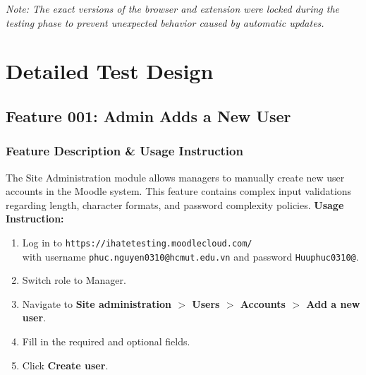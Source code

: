 \documentclass[twoside,final]{hcmut-report}
\begin{document}
\textit{Note: The exact versions of the browser and extension were locked during the testing phase to prevent unexpected behavior caused by automatic updates.}

\newpage
\section{Detailed Test Design}

\subsection{Feature 001: Admin Adds a New User}

\subsubsection{Feature Description \& Usage Instruction}
The Site Administration module allows managers to manually create new user accounts in the Moodle system. This feature contains complex input validations regarding length, character formats, and password complexity policies.
\newline
\textbf{Usage Instruction:}
\begin{enumerate}
    \item Log in to \texttt{https://ihatetesting.moodlecloud.com/} \\ with username \texttt{phuc.nguyen0310@hcmut.edu.vn} and password \texttt{Huuphuc0310@}.
    \item Switch role to Manager.
    \item Navigate to \textbf{Site administration $>$ Users $>$ Accounts $>$ Add a new user}.
    \item Fill in the required and optional fields.
    \item Click \textbf{Create user}.
\end{enumerate}
\end{document}
